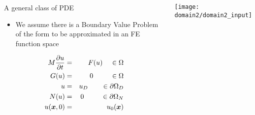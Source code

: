\begin{frame}
  \begin{columns}[t]
    \begin{block}{A general class of PDE}      %
      \begin{itemize}
      \item We assume there is a Boundary Value Problem
      of the form to be approximated in an FE function space
      \end{itemize}
      \vspace{-.1in}
      \begin{eqnarray}
	\label{eqn:general_pde}
	\nonumber
	M \frac{\partial u}{\partial t} & = & F( u ) \;\;\;\; \in \Omega
        \\
	\nonumber
	G( u ) & = & 0 \;\;\;\;\;\;\;\;\; \in \Omega
	\\
	\nonumber
	u & = & u_D \;\;\;\;\;\;\; \in \partial \Omega_D
	\\
	\nonumber
	N(u) & = & 0 \;\;\;\;\;\;\;\;\; \in \partial \Omega_N
 	\\
 	\nonumber
 	u({\boldsymbol{x}}, 0) & = & u_0({\boldsymbol{x}})
      \end{eqnarray}
    \end{block}
      \begin{center}
	\texttt{[image: domain2/domain2\_input]}
      \end{center}
  \end{columns}
\end{frame}
